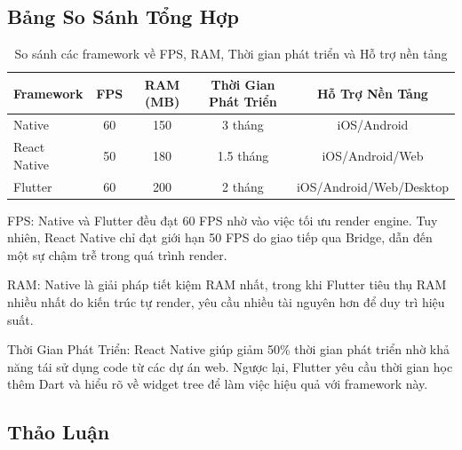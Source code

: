 \subsection{Bảng So Sánh Tổng Hợp}
\renewcommand{\labelitemi}{--}    
\begin{table}[H]
  \centering
  \begin{tabular}{|l|c|c|c|c|}
  \hline
  \textbf{Framework} & \textbf{FPS} & \textbf{RAM (MB)} & \textbf{Thời Gian Phát Triển} & \textbf{Hỗ Trợ Nền Tảng} \\
  \hline
  Native       & 60          & 150               & 3 tháng                      & iOS/Android \\
  React Native & 50          & 180               & 1.5 tháng                    & iOS/Android/Web \\
  Flutter      & 60          & 200               & 2 tháng                      & iOS/Android/Web/Desktop \\
  \hline
  \end{tabular}
  \caption{So sánh các framework về FPS, RAM, Thời gian phát triển và Hỗ trợ nền tảng}
  \end{table}
  

  \begin{flushleft}
      \hspace*{0.8cm}FPS: Native và Flutter đều đạt 60 FPS nhờ vào việc tối ưu render engine. Tuy nhiên, React Native chỉ đạt giới hạn 50 FPS do giao tiếp qua Bridge, dẫn đến một sự chậm trễ trong quá trình render.
  \end{flushleft}

  \begin{flushleft}
      \hspace*{0.8cm}RAM: Native là giải pháp tiết kiệm RAM nhất, trong khi Flutter tiêu thụ RAM nhiều nhất do kiến trúc tự render, yêu cầu nhiều tài nguyên hơn để duy trì hiệu suất.
  \end{flushleft}

  \begin{flushleft}
      \hspace*{0.8cm}Thời Gian Phát Triển: React Native giúp giảm 50\% thời gian phát triển nhờ khả năng tái sử dụng code từ các dự án web. Ngược lại, Flutter yêu cầu thời gian học thêm Dart và hiểu rõ về widget tree để làm việc hiệu quả với framework này.
  \end{flushleft}

\subsection{Thảo Luận}
\renewcommand{\labelitemi}{--}    
